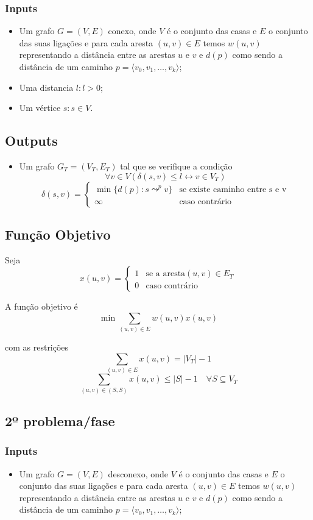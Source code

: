 \documentclass[a4paper,12pt,titlepage]{article}
\let\biconditional\leftrightarrow
\begin{document}
\subsubsection*{Inputs}
\begin{itemize}
\item Um grafo  $G= ( V, E ) $ conexo, onde $V$ é o conjunto das casas e $E$ o conjunto das suas ligações e para cada aresta $(u,v)\in E$ temos $w(u,v)$ representando a distância entre as arestas $u$ e $v$ e $d(p)$ como sendo a distância de um caminho $p = \langle v_0,v_1,\ldots , v_k\rangle$\cite[p.~624]{intro_algo};
\item Uma distancia $l:l > 0$;
\item Um vértice $s:s\in V$.
\end{itemize}

\subsection*{Outputs}
\begin{itemize}
\item Um grafo $G_T = ( V_T,E_T )$ tal que se verifique a condição\cite[p.~643]{intro_algo}
$$ \forall v \in V(\delta(s,v) \leq l \biconditional v \in V_T)$$
$$\delta(s,v) = 
\begin{cases}
\min \{d(p): s \leadsto^p v\} & \text{se existe caminho entre s e v}\\
\infty & \text{caso contrário} 
\end{cases}$$
\end{itemize}

\subsection*{Função Objetivo}
Seja $$x(u,v) = \begin{cases}
1 & \text{se a aresta} (u,v) \in E_T\\
0 & \text{caso contrário} 
\end{cases}$$

A função objetivo é\cite{ieor_mst}
$$\min \sum_{(u,v)\in E} w(u,v)x(u,v)$$

com as restrições 
$$\sum_{(u,v)\in E} x(u,v) = |V_T| - 1$$
$$\sum_{(u,v)\in (S,S)} x(u,v) \leq |S| - 1 \quad \forall S \subseteq  V_T$$

\subsection{2º problema/fase}
\subsubsection*{Inputs}
\begin{itemize}
\item Um grafo  $G= ( V, E ) $ desconexo, onde $V$ é o conjunto das casas e $E$ o conjunto das suas ligações e para cada aresta $(u,v)\in E$ temos $w(u,v)$ representando a distância entre as arestas $u$ e $v$ e $d(p)$ como sendo a distância de um caminho $p = \langle v_0,v_1,\ldots , v_k\rangle$\cite[p.~624]{intro_algo};
\end{itemize}
\end{document}
